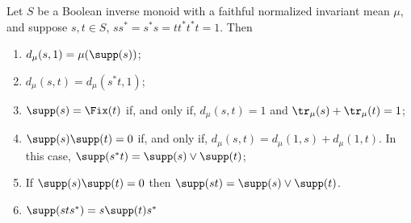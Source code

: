 \begin{lemma}\label{lemmasupportssofic}
Let $S$ be a Boolean inverse monoid with a faithful normalized invariant mean $\mu$, and suppose $s,t\in S$, $ss^*=s^*s=tt^*t^*t=1$. Then
\begin{enumerate}
\item[(a)] $d_\mu(s,1)=\mu(\supp(s))$;
\item[(b)] $d_\mu(s,t)=d_\mu(s^*t,1)$;
\item[(c)] $\supp(s)=\Fix(t)$ if, and only if, $d_\mu(s,t)=1$ and $\tr_\mu(s)+\tr_\mu(t)=1$;
\item[(d)] $\supp(s)\supp(t)=0$ if, and only if, $d_\mu(s,t)=d_\mu(1,s)+d_\mu(1,t)$. In this case, $\supp(s^*t)=\supp(s)\lor\supp(t)$;
\item[(e)] If $\supp(s)\supp(t)=0$ then $\supp(st)=\supp(s)\lor\supp(t)$.
\item[(f)] $\supp(sts^*)=s\supp(t)s^*$
\end{enumerate}
\end{lemma}
